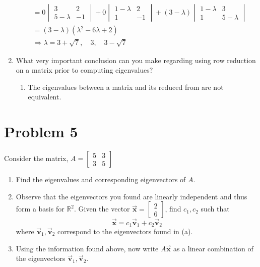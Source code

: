 \documentclass[letter,11pt]{article}
\theoremstyle{definition}
\begin{document}
\begin{tcolorbox}[boxrule=1mm,enhanced jigsaw, breakable,before=\hfill,after=\hfill,adjusted title={Problem 3 solutions}]
\begin{enumerate}[label = (\Alph*.)]
\begin{align*}
                &= 0\begin{vmatrix} 3 & 2 \\ 5-\lambda & -1 \end{vmatrix} + 0 \begin{vmatrix} 1-\lambda & 2 \\ 1 & -1 \end{vmatrix} + (3-\lambda) \begin{vmatrix} 1-\lambda & 3 \\ 1 & 5-\lambda \end{vmatrix}\\ 
                & = (3-\lambda)\left(\lambda^2 -6\lambda +2\right)\\
                &\Rightarrow \boxed{\lambda = 3+\sqrt{7},\quad 3,\quad 3-\sqrt{7}}
            \end{align*}
    \item What very important conclusion can you make regarding using row reduction on a matrix prior to computing eigenvalues?
    \begin{enumerate}
        \item The eigenvalues between a matrix and its reduced from are not equivalent.
    \end{enumerate}
\end{enumerate}
\end{tcolorbox}
\newpage
\section{Problem 5}
Consider the matrix, $A=\begin{bmatrix}5 & 3 \\ 3 & 5\end{bmatrix}$
\begin{enumerate}[label = (\Alph*.)]
    \item Find the eigenvalues and corresponding eigenvectors of $A$.
    \item Observe that the eigenvectors you found are linearly independent and thus form a basis for $\mathbb{R}^2$. Given the vector $\vec{\boldsymbol{x}}=\begin{bmatrix}2 \\ 6\end{bmatrix}$, find $c_1, c_2$ such that 
    $$\vec{\boldsymbol{x}}=c_1 \vec{\boldsymbol{v}}_1+c_2 \vec{\boldsymbol{v}}_2 $$ 
    where $\vec{\boldsymbol{v}}_1, \vec{\boldsymbol{v}}_2$ correspond to the eigenvectors found in (a).
    \item Using the information found above, now write $A \vec{\boldsymbol{x}}$ as a linear combination of the eigenvectors $\vec{\boldsymbol{v}}_1, \vec{\boldsymbol{v}}_2$.
\end{enumerate}
\end{document}
